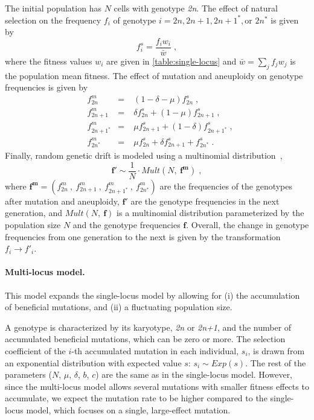 \documentclass[12pt]{extarticle}
\let\vec\mathbf
\newcommand{\euwt}{\emph{2n}}
\newcommand{\anwt}{\emph{2n+1}}
\begin{document}
The initial population has $N$ cells with genotype \euwt.
The effect of natural selection on the frequency $f_i$ of genotype $i = 2n, 2n+1, 2n+1^*, \text{or } 2n^*$ is given by
    \begin{equation} \label{eq:selection-single} 
      f^s_i = \frac{f_i w_i}{\bar{w}} \;,
    \end{equation}
where the fitness values $w_i$ are given in \autoref{table:single-locus} and $\bar{w} = \sum_{j}{f_j w_j}$ is the population mean fitness.
The effect of mutation and aneuploidy on genotype frequencies is given by
    \begin{equation} \label{eq:mutation-aneuploidy-single}
    \begin{aligned}
      &f^m_{2n} &=&\; (1 - \delta - \mu) f^s_{2n}  \;,\\
      &f^m_{2n+1} &=&\; \delta f^s_{2n} + (1 - \mu) f^s_{2n+1}  \;,\\
      &f^m_{2n+1^*} &=&\; \mu f^s_{2n+1} + (1-\delta) f^s_{2n+1^*}  \;,\\
      &f^m_{2n^*} &=&\; \mu f^s_{2n} + \delta f^s_{2n+1} + f^s_{2n^*}  \;.
    \end{aligned}
    \end{equation}
Finally, random genetic drift is modeled using a multinomial distribution~\citep{Otto2007},
    \begin{equation} \label{eq:drift-single}
      \vec{f'} \sim \frac{1}{N} \cdot \mathit{Mult}(N,\ \vec{f^m}) \;,
    \end{equation}
where $\vec{f^m}=(f^m_{2n}\ ,\ f^m_{2n+1}\ ,\ f^m_{2n+1^*}\ ,\ f^m_{2n^*})$ are the frequencies of the genotypes after mutation and aneuploidy, $\vec{f'}$ are the genotype frequencies in the next generation, and $Mult(N,\ \vec{f})$ is a multinomial distribution parameterized by the population size $N$ and the genotype frequencies $\vec{f}$.
Overall, the change in genotype frequencies from one generation to the next is given by the transformation $f_i \to f'_i$.

\paragraph*{Multi-locus model.}
This model expands the single-locus model by allowing for (i) the accumulation of beneficial mutations, and (ii) a fluctuating population size. 

A genotype is characterized by its karyotype, \euwt\; or \anwt, and the number of accumulated beneficial mutations, which can be zero or more.
The selection coefficient of the $i$-th accumulated mutation in each individual, $s_i$, is drawn from an exponential distribution with expected value $s$: $s_i \sim \mathit{Exp{(s)}}$.
The rest of the parameters ($N$, $\mu$, $\delta$, $b$, $c$) are the same as in the single-locus model. However, since the multi-locus model allows several mutations with smaller fitness effects to accumulate, we expect the mutation rate to be higher compared to the single-locus model, which focuses on a single, large-effect mutation.
\end{document}
